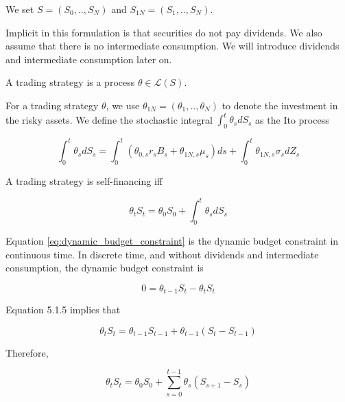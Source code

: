 \documentclass[\topdir/lecture\_notes.tex]{subfiles}
\begin{document}
We set \(S=\left(S_{0}, . ., S_{N}\right)\) and \(S_{1 N}=\left(S_{1}, . ., S_{N}\right)\).

Implicit in this formulation is that securities do not pay dividends. We also assume that there is no intermediate consumption. We will introduce dividends and intermediate consumption later on.

\begin{defn}\label{def:trading_strategy}
A trading strategy is a process \(\theta \in \mathcal{L}(S)\).
\end{defn}

For a trading strategy \(\theta\), we use \(\theta_{1 N}=\left(\theta_{1}, . ., \theta_{N}\right)\) to denote the investment in the risky assets. We define the stochastic integral \(\int_{0}^{t} \theta_{s} d S_{s}\) as the Ito process

\begin{equation*}
\int_{0}^{t} \theta_{s} d S_{s}=\int_{0}^{t}\left(\theta_{0, s} r_{s} B_{s}+\theta_{1 N, s} \mu_{s}\right) d s+\int_{0}^{t} \theta_{1 N, s} \sigma_{s} d Z_{s}
\end{equation*}

\begin{defn}\label{def:self_financing}
A trading strategy is self-financing iff

\begin{equation}
\theta_{t} S_{t}=\theta_{0} S_{0}+\int_{0}^{t} \theta_{s} d S_{s} \label{eq:dynamic_budget_constraint}
\end{equation}

\end{defn}

Equation \eqref{eq:dynamic_budget_constraint} is the dynamic budget constraint in continuous time. In discrete time, and without dividends and intermediate consumption, the dynamic budget constraint is

\begin{equation*}
0=\theta_{t-1} S_{t}-\theta_{t} S_{t}
\end{equation*}

Equation 5.1.5 implies that

\begin{equation*}
\theta_{t} S_{t}=\theta_{t-1} S_{t-1}+\theta_{t-1}\left(S_{t}-S_{t-1}\right)
\end{equation*}

Therefore,

\begin{equation*}
\theta_{t} S_{t}=\theta_{0} S_{0}+\sum_{s=0}^{t-1} \theta_{s}\left(S_{s+1}-S_{s}\right)
\end{equation*}
\end{document}
